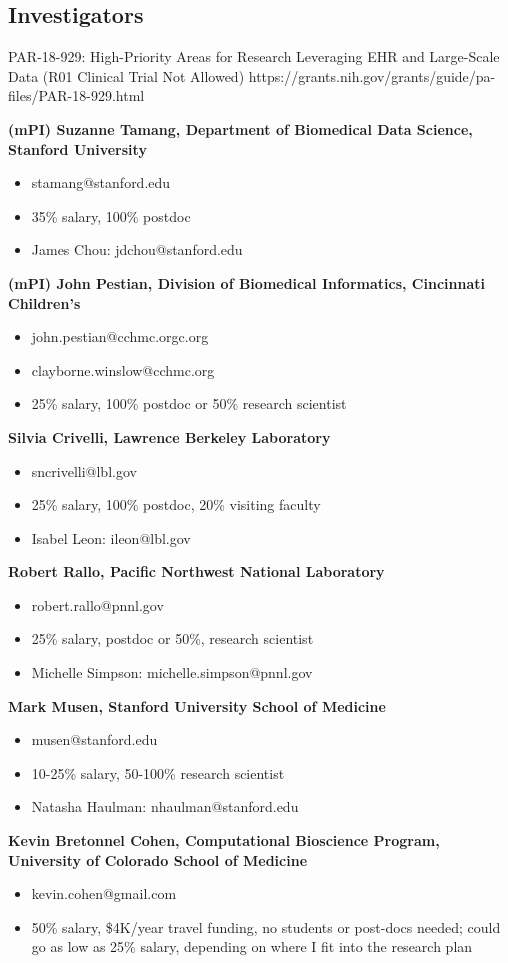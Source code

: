 
\subsection{Investigators}
PAR-18-929: High-Priority Areas for Research Leveraging EHR and Large-Scale Data (R01 Clinical Trial Not Allowed)
https://grants.nih.gov/grants/guide/pa-files/PAR-18-929.html
\newline


\noindent \textbf{(mPI) Suzanne Tamang, Department of Biomedical Data Science, Stanford University}
\begin{itemize}
\item{stamang@stanford.edu}
\item{35\% salary, 100\% postdoc}
\item{James Chou: jdchou@stanford.edu}
\end{itemize}

\textbf{(mPI) John Pestian, Division of Biomedical Informatics, Cincinnati Children's}

\begin{itemize}
\item{john.pestian@cchmc.orgc.org}
\item{clayborne.winslow@cchmc.org}
\item{25\% salary, 100\% postdoc or 50\% research scientist}
\end{itemize}

\noindent \textbf{Silvia Crivelli, Lawrence Berkeley Laboratory}
\begin{itemize}
\item{sncrivelli@lbl.gov}
\item{25\% salary, 100\% postdoc, 20\% visiting faculty}
\item{Isabel Leon: ileon@lbl.gov}
\end{itemize}

\noindent \textbf{Robert Rallo, Pacific Northwest National Laboratory}
\begin{itemize}
\item{robert.rallo@pnnl.gov}
\item{25\% salary, postdoc or 50\%, research scientist}
\item{Michelle Simpson: michelle.simpson@pnnl.gov}
\end{itemize}

\noindent \textbf{Mark Musen, Stanford University School of Medicine}
\begin{itemize}
\item{musen@stanford.edu}
\item{10-25\% salary, 50-100\% research scientist}
\item{Natasha Haulman: nhaulman@stanford.edu}
\end{itemize}

\noindent \textbf{Kevin Bretonnel Cohen, Computational Bioscience Program, University of Colorado School of Medicine}
\begin{itemize}
\item{kevin.cohen@gmail.com}
\item{50\% salary, \$4K/year travel funding, no students or post-docs needed; could go as low as 25\% salary, depending on where I fit into the research plan}
\end{itemize}



